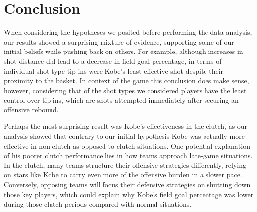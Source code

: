 \documentclass[paper=a4, fontsize=11pt]{scrartcl} %
\numberwithin{equation}{section} %
\numberwithin{figure}{section} %
\numberwithin{table}{section} %
\begin{document}
\section{Conclusion}
\hspace*{1cm}When considering the hypotheses we posited before performing the data analysis, our results showed a surprising mixture of evidence, supporting some of our initial beliefs while pushing back on others. For example, although increases in shot distance did lead to a decrease in field goal percentage, in terms of individual shot type tip ins were Kobe's least effective shot despite their proximity to the basket. In context of the game this conclusion does make sense, however, considering that of the shot types we considered players have the least control over tip ins, which are shots attempted immediately after securing an offensive rebound. 

\hspace*{1cm}Perhaps the most surprising result was Kobe's effectiveness in the clutch, as our analysis showed that contrary to our initial hypothesis Kobe was actually more effective in non-clutch as opposed to clutch situations. One potential explanation of his poorer clutch performance lies in how teams approach late-game situations. In the clutch, many teams structure their offensive strategies differently, relying on stars like Kobe to carry even more of the offensive burden in a slower pace. Conversely, opposing teams will focus their defensive strategies on shutting down those key players, which could explain why Kobe's field goal percentage was lower during those clutch periods compared with normal situations. 
\end{document}
